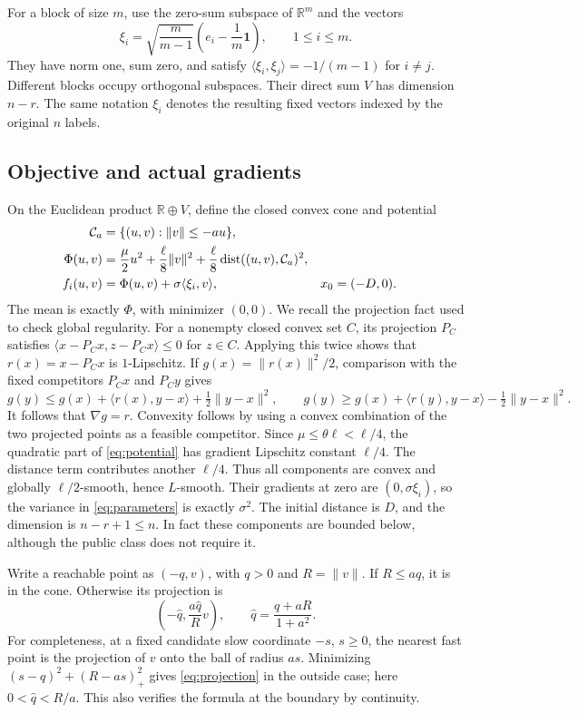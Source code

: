 \documentclass[11pt]{article}
\theoremstyle{remark}
\newcommand{\R}{\mathbb R}
\newcommand{\ip}[2]{\langle #1,#2\rangle}
\newcommand{\norm}[1]{\lVert #1\rVert}
\newcommand{\dist}{\operatorname{dist}}
\begin{document}
For a block of size $m$, use the zero-sum subspace of $\R^m$ and the
vectors
\begin{equation}\label{eq:simplex}
 \xi_i=\sqrt{\frac m{m-1}}
       \left(e_i-\frac1m\mathbf1\right),\qquad 1\le i\le m.
\end{equation}
They have norm one, sum zero, and satisfy
$\ip{\xi_i}{\xi_j}=-1/(m-1)$ for $i\ne j$. Different blocks occupy
orthogonal subspaces. Their direct sum $V$ has dimension $n-r$.
The same notation $\xi_i$ denotes the resulting fixed vectors indexed
by the original $n$ labels.

\subsection{Objective and actual gradients}
On the Euclidean product $\R\oplus V$, define the closed convex cone
and potential
\begin{align}
 \mathcal C_a&=\{(u,v):\norm v\le-au\},\notag\\
 \Phi(u,v)&=\frac\mu2u^2+\frac\ell8\norm v^2
                 +\frac\ell8\dist((u,v),\mathcal C_a)^2,\label{eq:potential}\\
 f_i(u,v)&=\Phi(u,v)+\sigma\ip{\xi_i}{v},
 &x_0&=(-D,0).\label{eq:components}
\end{align}
The mean is exactly $\Phi$, with minimizer $(0,0)$. We recall the
projection fact used to check global regularity. For a nonempty closed
convex set $C$, its projection $P_C$ satisfies
$\ip{x-P_Cx}{z-P_Cx}\le0$ for $z\in C$. Applying this twice shows
that $r(x)=x-P_Cx$ is $1$-Lipschitz. If
$g(x)=\norm{r(x)}^2/2$, comparison with the fixed competitors $P_Cx$
and $P_Cy$ gives
\[
 g(y)\le g(x)+\ip{r(x)}{y-x}+\tfrac12\norm{y-x}^2,\qquad
 g(y)\ge g(x)+\ip{r(y)}{y-x}-\tfrac12\norm{y-x}^2.
\]
It follows that $\nabla g=r$. Convexity follows by using a convex
combination of the two projected points as a feasible competitor.
Since $\mu\le\theta\ell<\ell/4$, the quadratic
part of \eqref{eq:potential} has gradient Lipschitz constant $\ell/4$.
The distance term contributes another $\ell/4$. Thus all components
are convex and globally $\ell/2$-smooth, hence $L$-smooth. Their
gradients at zero are $(0,\sigma\xi_i)$, so the variance in
\eqref{eq:parameters} is exactly $\sigma^2$. The initial distance is
$D$, and the dimension is $n-r+1\le n$. In fact these components are
bounded below, although the public class does not require it.

Write a reachable point as $(-q,v)$, with $q>0$ and $R=\norm v$.
If $R\le aq$, it is in the cone. Otherwise its projection is
\begin{equation}\label{eq:projection}
 \left(-\widehat q,\frac{a\widehat q}{R}v\right),
 \qquad \widehat q=\frac{q+aR}{1+a^2}.
\end{equation}
For completeness, at a fixed candidate slow coordinate $-s$, $s\ge0$,
the nearest fast point is the projection of $v$ onto the ball of radius
$as$. Minimizing $(s-q)^2+(R-as)_+^2$ gives
\eqref{eq:projection} in the outside case; here
$0<\widehat q<R/a$. This also verifies the formula at the boundary
by continuity.
\end{document}

